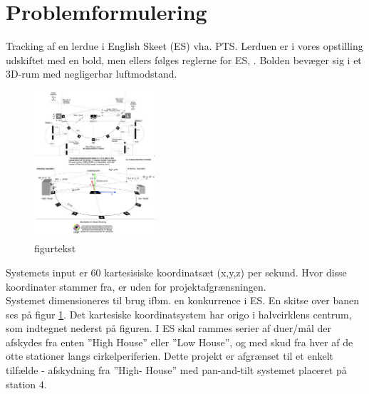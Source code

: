 \section{Problemformulering}
Tracking af en lerdue i English Skeet (ES) vha. PTS. 
Lerduen er i vores opstilling udskiftet med en bold, men ellers følges reglerne for ES, \citep{ES_regler}.
Bolden bevæger sig i et 3D-rum med negligerbar luftmodstand. \\

\begin{figure}[th!]
\centering
\includegraphics[width=0.4\textwidth]{./graphics/skeet-diagram_med_akser}
\caption[tekst i indholdsfortegnelsen]{figurtekst}
\label{fig:ES}
\end{figure}	
Systemets input er 60 kartesisiske koordinatsæt (x,y,z) per sekund. Hvor disse 
koordinater stammer fra, er uden for projektafgrænsningen. \\

Systemet dimensioneres til brug ifbm. en konkurrence i ES. En skitse over 
banen ses på figur \ref{fig:ES}. Det kartesiske koordinatsystem har origo i halvcirklens centrum, 
som indtegnet 
nederst på figuren. I ES skal rammes serier af duer/mål der afskydes fra 
enten ”High House” eller ”Low House”, og med skud fra hver af de otte stationer langs 
cirkelperiferien. Dette projekt er afgrænset til et enkelt tilfælde - afskydning fra ”High-
House” med pan-and-tilt systemet placeret på station 4.\\

